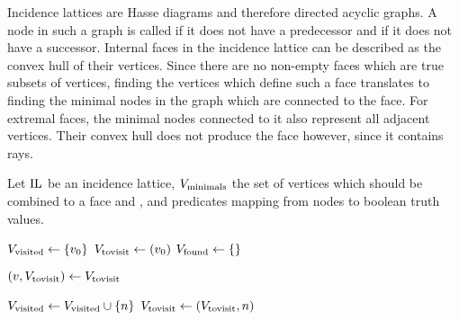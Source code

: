Incidence lattices are Hasse diagrams and therefore directed acyclic graphs.
A node in such a graph is called  if it does not have a predecessor and  if it does not have a successor.
Internal faces in the incidence lattice can be described as the convex hull of their vertices.
Since there are no non-empty faces which are true subsets of vertices, finding the vertices which define such a face translates to finding the minimal nodes in the graph which are connected to the face.
For extremal faces, the minimal nodes connected to it also represent all adjacent vertices.
Their convex hull does not produce the face however, since it contains rays.

\begin{algorithm}[tbp]
    Let $\operatorname{IL}$ be an incidence lattice, $V_{\textnormal{minimals}}$ the set of vertices which should be combined to a face and ,  and  predicates mapping from nodes to boolean truth values.
    \begin{algorithmic}[1]
            \State $V_{\textnormal{visited}} \gets \left\{ v_0 \right\}$
            \State $V_{\textnormal{tovisit}} \gets ( v_0 )$
            \State $V_{\textnormal{found}} \gets \left\{  \right\}$

                \State $(v, V_{\textnormal{tovisit}}) \gets V_{\textnormal{tovisit}}$ 

                            \State $V_{\textnormal{visited}} \gets V_{\textnormal{visited}} \cup \left\{ n \right\}$
                            \State $V_{\textnormal{tovisit}} \gets (V_{\textnormal{tovisit}}, n)$ 
                        \EndIf
                    \EndFor
                \EndIf


\end{algorithmic}
\end{algorithm}
